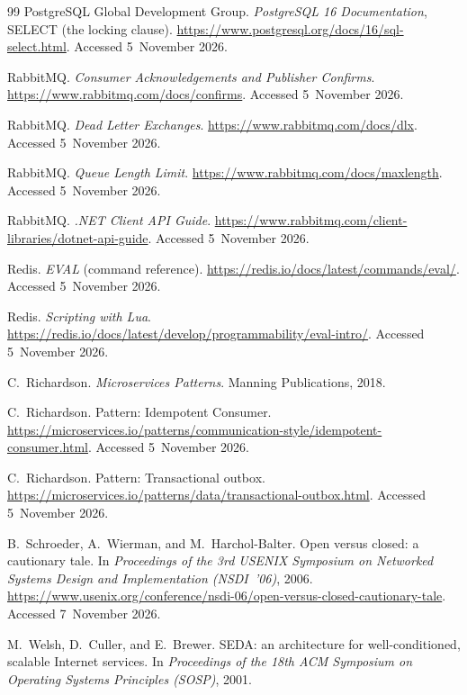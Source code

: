\documentclass[a4paper]{report}
\begin{document}
\begin{thebibliography}{99}
PostgreSQL Global Development Group.
\newblock \emph{PostgreSQL 16 Documentation}, SELECT (the locking clause).
\newblock \url{https://www.postgresql.org/docs/16/sql-select.html}. Accessed
5~November 2026.

RabbitMQ.
\newblock \emph{Consumer Acknowledgements and Publisher Confirms}.
\newblock \url{https://www.rabbitmq.com/docs/confirms}. Accessed 5~November
2026.

RabbitMQ.
\newblock \emph{Dead Letter Exchanges}.
\newblock \url{https://www.rabbitmq.com/docs/dlx}. Accessed 5~November 2026.

RabbitMQ.
\newblock \emph{Queue Length Limit}.
\newblock \url{https://www.rabbitmq.com/docs/maxlength}. Accessed 5~November
2026.

RabbitMQ.
\newblock \emph{.NET Client API Guide}.
\newblock \url{https://www.rabbitmq.com/client-libraries/dotnet-api-guide}.
Accessed 5~November 2026.

Redis.
\newblock \emph{EVAL} (command reference).
\newblock \url{https://redis.io/docs/latest/commands/eval/}. Accessed
5~November 2026.

Redis.
\newblock \emph{Scripting with Lua}.
\newblock \url{https://redis.io/docs/latest/develop/programmability/eval-intro/}.
Accessed 5~November 2026.

C.~Richardson.
\newblock \emph{Microservices Patterns}.
\newblock Manning Publications, 2018.

C.~Richardson.
\newblock Pattern: Idempotent Consumer.
\newblock \url{https://microservices.io/patterns/communication-style/idempotent-consumer.html}.
Accessed 5~November 2026.

C.~Richardson.
\newblock Pattern: Transactional outbox.
\newblock \url{https://microservices.io/patterns/data/transactional-outbox.html}.
Accessed 5~November 2026.

B.~Schroeder, A.~Wierman, and M.~Harchol-Balter.
\newblock Open versus closed: a cautionary tale.
\newblock In \emph{Proceedings of the 3rd USENIX Symposium on Networked
Systems Design and Implementation (NSDI~'06)}, 2006.
\newblock \url{https://www.usenix.org/conference/nsdi-06/open-versus-closed-cautionary-tale}. Accessed 7~November 2026.

M.~Welsh, D.~Culler, and E.~Brewer.
\newblock SEDA: an architecture for well-conditioned, scalable Internet
services.
\newblock In \emph{Proceedings of the 18th ACM Symposium on Operating Systems
Principles (SOSP)}, 2001.

\end{thebibliography}
\end{document}
